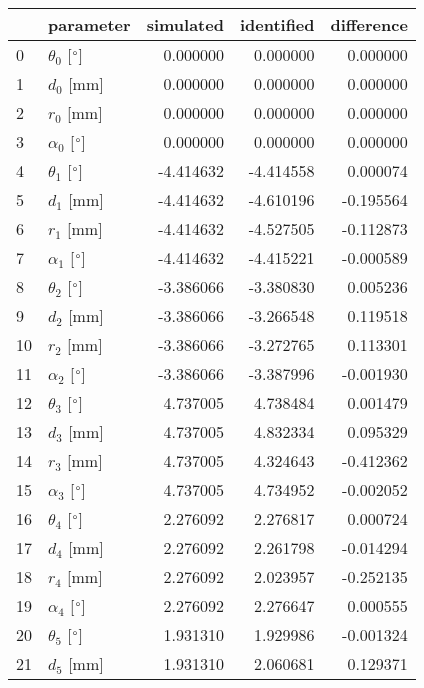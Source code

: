 \documentclass{standalone}%
\begin{document}
%
\normalsize%
\begin{tabular}{llrrr}
\toprule
{} &                 parameter & simulated & identified & difference \\
\midrule
0  &  $\theta_{0}$ [$\degree$] &  0.000000 &   0.000000 &   0.000000 \\
1  &              $d_{0}$ [mm] &  0.000000 &   0.000000 &   0.000000 \\
2  &              $r_{0}$ [mm] &  0.000000 &   0.000000 &   0.000000 \\
3  &  $\alpha_{0}$ [$\degree$] &  0.000000 &   0.000000 &   0.000000 \\
4  &  $\theta_{1}$ [$\degree$] & -4.414632 &  -4.414558 &   0.000074 \\
5  &              $d_{1}$ [mm] & -4.414632 &  -4.610196 &  -0.195564 \\
6  &              $r_{1}$ [mm] & -4.414632 &  -4.527505 &  -0.112873 \\
7  &  $\alpha_{1}$ [$\degree$] & -4.414632 &  -4.415221 &  -0.000589 \\
8  &  $\theta_{2}$ [$\degree$] & -3.386066 &  -3.380830 &   0.005236 \\
9  &              $d_{2}$ [mm] & -3.386066 &  -3.266548 &   0.119518 \\
10 &              $r_{2}$ [mm] & -3.386066 &  -3.272765 &   0.113301 \\
11 &  $\alpha_{2}$ [$\degree$] & -3.386066 &  -3.387996 &  -0.001930 \\
12 &  $\theta_{3}$ [$\degree$] &  4.737005 &   4.738484 &   0.001479 \\
13 &              $d_{3}$ [mm] &  4.737005 &   4.832334 &   0.095329 \\
14 &              $r_{3}$ [mm] &  4.737005 &   4.324643 &  -0.412362 \\
15 &  $\alpha_{3}$ [$\degree$] &  4.737005 &   4.734952 &  -0.002052 \\
16 &  $\theta_{4}$ [$\degree$] &  2.276092 &   2.276817 &   0.000724 \\
17 &              $d_{4}$ [mm] &  2.276092 &   2.261798 &  -0.014294 \\
18 &              $r_{4}$ [mm] &  2.276092 &   2.023957 &  -0.252135 \\
19 &  $\alpha_{4}$ [$\degree$] &  2.276092 &   2.276647 &   0.000555 \\
20 &  $\theta_{5}$ [$\degree$] &  1.931310 &   1.929986 &  -0.001324 \\
21 &              $d_{5}$ [mm] &  1.931310 &   2.060681 &   0.129371 \\

\end{tabular}
\end{document}
